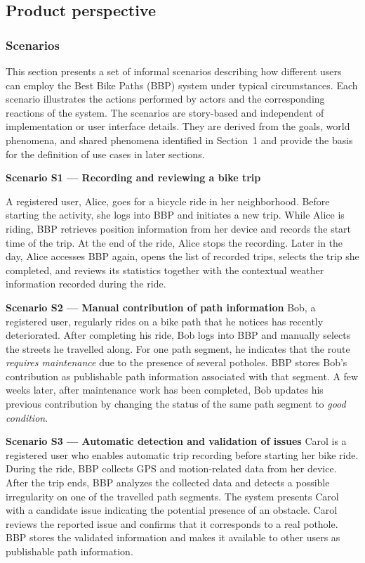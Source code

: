 \subsection{Product perspective}
\subsubsection{Scenarios}

This section presents a set of informal scenarios describing how different users can employ
the Best Bike Paths (BBP) system under typical circumstances. Each scenario illustrates the
actions performed by actors and the corresponding reactions of the system. The scenarios are
story-based and independent of implementation or user interface details. They are derived
from the goals, world phenomena, and shared phenomena identified in Section~1 and provide
the basis for the definition of use cases in later sections.

\textbf{Scenario S1 --- Recording and reviewing a bike trip}
 
A registered user, Alice, goes for a bicycle ride in her neighborhood. Before starting the activity, she logs into BBP and initiates a new trip. While Alice is riding, BBP retrieves position information from her device and records the start time of the trip. At the end of the ride, Alice stops the recording. Later in the day, Alice accesses BBP again, opens the list of
recorded trips, selects the trip she completed, and reviews its statistics together with the contextual weather information recorded during the ride.

\textbf{Scenario S2 --- Manual contribution of path information}
Bob, a registered user, regularly rides on a bike path that he notices has recently deteriorated.
After completing his ride, Bob logs into BBP and manually selects the streets he travelled along.
For one path segment, he indicates that the route \emph{requires maintenance} due to the
presence of several potholes. BBP stores Bob's contribution as publishable path information
associated with that segment. A few weeks later, after maintenance work has been completed,
Bob updates his previous contribution by changing the status of the same path segment to
\emph{good condition}.


\textbf{Scenario S3 --- Automatic detection and validation of issues}
Carol is a registered user who enables automatic trip recording before starting her bike ride.
During the ride, BBP collects GPS and motion-related data from her device. After the trip ends,
BBP analyzes the collected data and detects a possible irregularity on one of the travelled path
segments. The system presents Carol with a candidate issue indicating the potential presence
of an obstacle. Carol reviews the reported issue and confirms that it corresponds to a real
pothole. BBP stores the validated information and makes it available to other users as
publishable path information.


